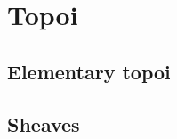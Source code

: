 \documentclass[10pt,oneside]{book}
\def\~#1{\mathscr{#1}}
\newcommand{\Set}{\~S\mathrm{et}}
\theoremstyle{plain}
\theoremstyle{definition}
\theoremstyle{remark}
\numberwithin{equation}{section}
\numberwithin{figure}{section}
\begin{document}




\chapter{Topoi}

\section{Elementary topoi}

\section{Sheaves} 
 
\end{document}
